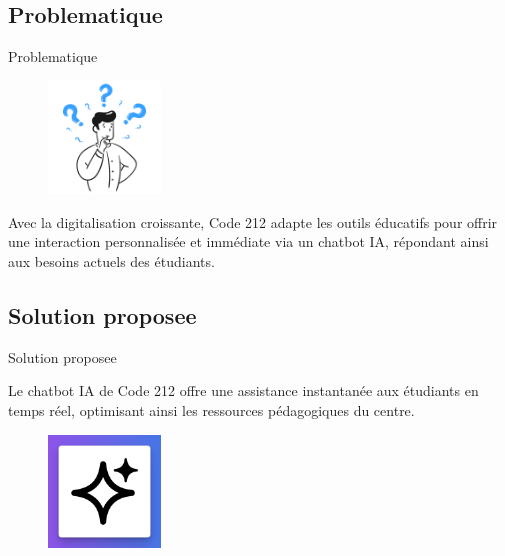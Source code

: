 \documentclass{beamer}
\begin{document}
\subsection{Problematique}
\begin{frame}{Problematique}
\begin{figure}[htpb]
        \centering
        \includegraphics[height=3cm]{pic/question.png}
    \end{figure}
   Avec la digitalisation croissante, Code 212 adapte les outils éducatifs pour offrir une interaction personnalisée et immédiate via un chatbot IA, répondant ainsi aux besoins actuels des étudiants.
\end{frame}

\subsection{Solution proposee}
\begin{frame}{Solution proposee}

Le chatbot IA de Code 212 offre une assistance instantanée aux étudiants en temps réel, optimisant ainsi les ressources pédagogiques du centre.
\begin{figure}[htpb]
        \centering
        \includegraphics[height=3cm]{pic/ia.png}
    \end{figure}
\end{frame}
\end{document}
